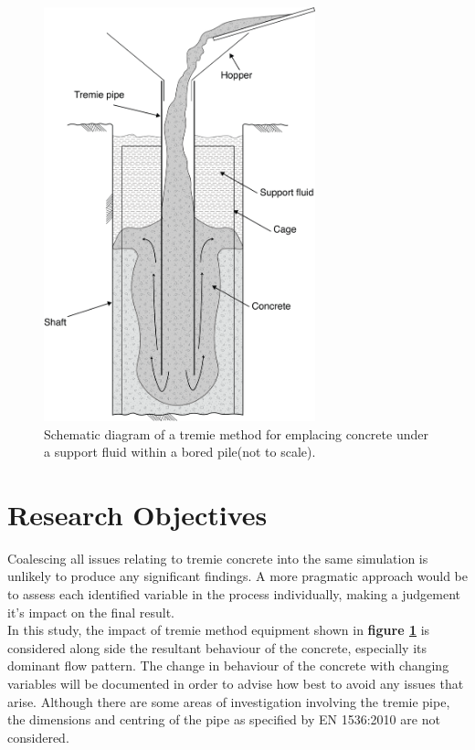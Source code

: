\begin{figure}[H]
\centering
\includegraphics[width=0.7\textwidth]{tremie_blank.png}
\caption{\label{fig:tremie_blank} Schematic diagram of a tremie method for emplacing concrete under a support fluid within a bored pile(not to scale).}
\end{figure}

\section{Research Objectives}
Coalescing all issues relating to tremie concrete into the same simulation is unlikely to produce any significant findings. A more pragmatic approach would be to assess each identified variable in the process individually, making a judgement it's impact on the final result.\\

\noindent
In this study, the impact of tremie method equipment shown in {\bfseries figure \ref{fig:tremie_blank}} is considered along side the resultant behaviour of the concrete, especially its dominant flow pattern. The change in behaviour of the concrete with changing variables will be documented in order to advise how best to avoid any issues that arise. Although there are some areas of investigation involving the tremie pipe, the dimensions and centring of the pipe as specified by EN 1536:2010 are not considered. 


